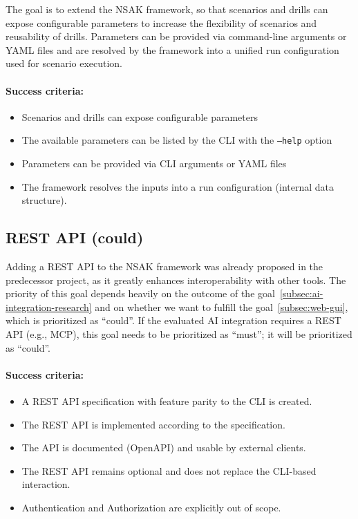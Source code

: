 The goal is to extend the \gls{NSAK} framework, so that scenarios and drills can expose configurable parameters to increase the flexibility of scenarios and reusability of drills.
Parameters can be provided via command-line arguments or \gls{YAML} files and are resolved by the framework into a unified run configuration used for scenario execution.

\paragraph{Success criteria:}

\begin{itemize}
	\item Scenarios and drills can expose configurable parameters
	\item The available parameters can be listed by the \gls{CLI} with the \texttt{--help} option
	\item Parameters can be provided via \gls{CLI} arguments or \gls{YAML} files
	\item The framework resolves the inputs into a run configuration (internal data structure).
\end{itemize}

\subsection{REST API (could)}\label{subsec:rest-api}

Adding a REST \gls{API} to the \gls{NSAK} framework was already proposed in the predecessor project, as it greatly enhances interoperability with other tools.
The priority of this goal depends heavily on the outcome of the goal~\ref{subsec:ai-integration-research} and on whether we want to fulfill the goal~\ref{subsec:web-gui}, which is prioritized as \enquote{could}.
If the evaluated \gls{AI} integration requires a \gls{REST API} (e.g., \gls{MCP}), this goal needs to be prioritized as \enquote{must}; it will be prioritized as \enquote{could}.

\paragraph{Success criteria:}

\begin{itemize}
	\item A REST \gls{API} specification with feature parity to the \gls{CLI} is created.
	\item The REST \gls{API} is implemented according to the specification.
	\item The \gls{API} is documented (\gls{OpenAPI}) and usable by external clients.
	\item The REST \gls{API} remains optional and does not replace the \gls{CLI}-based interaction.
	\item Authentication and Authorization are explicitly out of scope.
\end{itemize}

